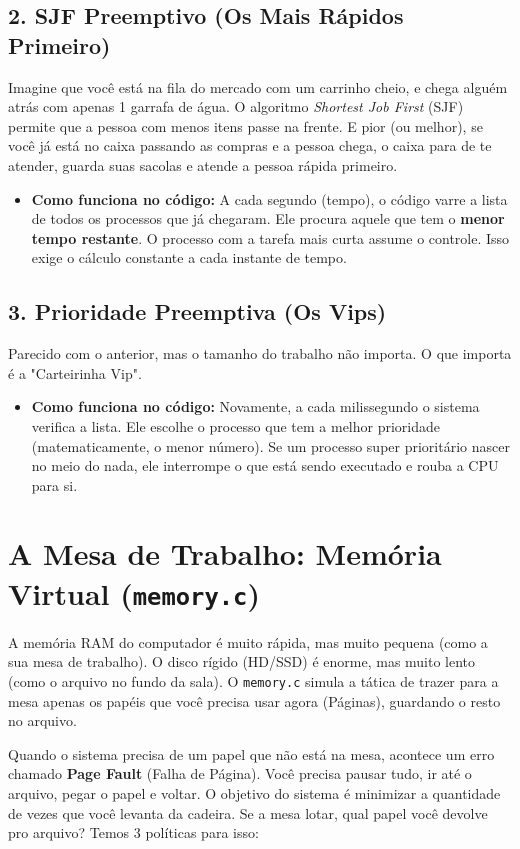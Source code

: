 \documentclass[12pt,a4paper]{article}
\begin{document}
\subsection{2. SJF Preemptivo (Os Mais Rápidos Primeiro)}
Imagine que você está na fila do mercado com um carrinho cheio, e chega alguém atrás com apenas 1 garrafa de água. O algoritmo \textit{Shortest Job First} (SJF) permite que a pessoa com menos itens passe na frente. E pior (ou melhor), se você já está no caixa passando as compras e a pessoa chega, o caixa para de te atender, guarda suas sacolas e atende a pessoa rápida primeiro.
\begin{itemize}
    \item \textbf{Como funciona no código:} A cada segundo (tempo), o código varre a lista de todos os processos que já chegaram. Ele procura aquele que tem o \textbf{menor tempo restante}. O processo com a tarefa mais curta assume o controle. Isso exige o cálculo constante a cada instante de tempo.
\end{itemize}

\subsection{3. Prioridade Preemptiva (Os Vips)}
Parecido com o anterior, mas o tamanho do trabalho não importa. O que importa é a "Carteirinha Vip".
\begin{itemize}
    \item \textbf{Como funciona no código:} Novamente, a cada milissegundo o sistema verifica a lista. Ele escolhe o processo que tem a melhor prioridade (matematicamente, o menor número). Se um processo super prioritário nascer no meio do nada, ele interrompe o que está sendo executado e rouba a CPU para si.
\end{itemize}

\section{A Mesa de Trabalho: Memória Virtual (\texttt{memory.c})}
A memória RAM do computador é muito rápida, mas muito pequena (como a sua mesa de trabalho). O disco rígido (HD/SSD) é enorme, mas muito lento (como o arquivo no fundo da sala). O \texttt{memory.c} simula a tática de trazer para a mesa apenas os papéis que você precisa usar agora (Páginas), guardando o resto no arquivo.

Quando o sistema precisa de um papel que não está na mesa, acontece um erro chamado \textbf{Page Fault} (Falha de Página). Você precisa pausar tudo, ir até o arquivo, pegar o papel e voltar. O objetivo do sistema é minimizar a quantidade de vezes que você levanta da cadeira. Se a mesa lotar, qual papel você devolve pro arquivo? Temos 3 políticas para isso:
\end{document}
